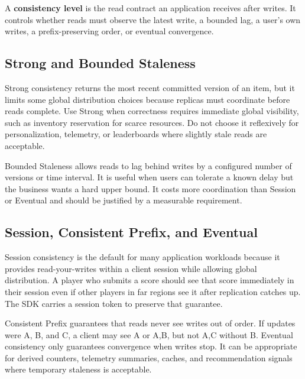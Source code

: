 \begin{definitionbox}
A \textbf{consistency level} is the read contract an application receives after writes. It controls whether reads must observe the latest write, a bounded lag, a user's own writes, a prefix-preserving order, or eventual convergence.
\end{definitionbox}

\subsection{Strong and Bounded Staleness}
Strong consistency returns the most recent committed version of an item, but it limits some global distribution choices because replicas must coordinate before reads complete. Use Strong when correctness requires immediate global visibility, such as inventory reservation for scarce resources. Do not choose it reflexively for personalization, telemetry, or leaderboards where slightly stale reads are acceptable.

Bounded Staleness allows reads to lag behind writes by a configured number of versions or time interval. It is useful when users can tolerate a known delay but the business wants a hard upper bound. It costs more coordination than Session or Eventual and should be justified by a measurable requirement.

\subsection{Session, Consistent Prefix, and Eventual}
Session consistency is the default for many application workloads because it provides read-your-writes within a client session while allowing global distribution. A player who submits a score should see that score immediately in their session even if other players in far regions see it after replication catches up. The SDK carries a session token to preserve that guarantee.

Consistent Prefix guarantees that reads never see writes out of order. If updates were A, B, and C, a client may see A or A,B, but not A,C without B. Eventual consistency only guarantees convergence when writes stop. It can be appropriate for derived counters, telemetry summaries, caches, and recommendation signals where temporary staleness is acceptable.

